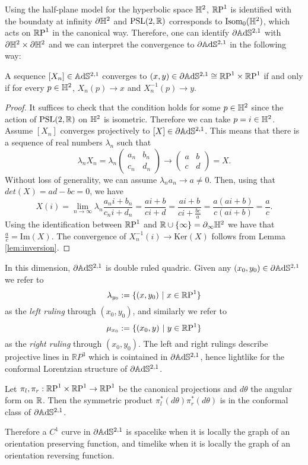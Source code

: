 Using the half-plane model for the hyperbolic space $\H^2$, $\S$ is identified with the boundaty at infinity $\partial \H^2$ and $\PSL$ corresponds to $\text{Isom}_0(\H^2)$, which acts on $\S$ in the canonical way.
Therefore, one can identify $\partial \A^{2,1}$ with $\partial \H^2 \times \partial \H^2$ and we can interpret the convergence to $\partial \A^{2,1}$ in the following way:
\begin{lemma} \label{lem:convergence}
    A sequence $[X_n] \in \A^{2,1}$ converges to $(x,y) \in \partial \A^{2,1} \cong \T$ if and only if for every $p\in\H^2$, $X_n(p) \to x$ and $X_n^{-1}(p) \to y$.
\end{lemma}

\begin{proof}
    It suffices to check that the condition holds for some $p\in\H^2$ since the action of $\PSL$ on $\H^2$ is isometric. Therefore we can take $p=i\in\H^2$. Assume $\left[ X_n \right]$ converges projectively to $\left[ X \right] \in \partial\A^{2,1}$. This means that there is a sequence of real numbers $\lambda_n$ such that
    \[
       \lambda_n X_n = \lambda_n
       \begin{pmatrix}
            a_n & b_n \\ c_n & d_n
        \end{pmatrix} \to
        \begin{pmatrix}
            a & b \\ c & d
        \end{pmatrix} =X.
    \]
    Without loss of generality, we can assume $\lambda_n a_n \to a \neq 0$. Then, using that $det(X)=ad-bc=0$, we have
    \[
        X(i) = \lim_{n\to \infty} \lambda_n \frac{a_n i + b_n}{c_n i + d_n} = \frac{ai +b}{ci+d} = \frac{ai + b}{ ci + \frac{bc}{a}} = \frac{a(ai+b)}{c(ai+b)} = \frac{a}{c}.
    \]
    Using the identification between $\S$ and $\R \cup \{ \infty \} = \partial_\infty \H^2$ we have that $\frac{a}{c} = \text{Im}(X)$. The convergence of $X_n^{-1}(i) \to \text{Ker}(X)$ follows from Lemma \ref{lem:inversion}.
\end{proof}

In this dimension, $\partial\A^{2,1}$ is double ruled quadric. Given any $(x_0,y_0) \in \partial\A^{2,1}$ we refer to
\[
    \lambda_{y_0} := \{ (x,y_0) \ | \ x \in\S \}
\]
as the \textit{left ruling} through $(x_0,y_0)$, and similarly we refer to
\[
    \mu_{x_0} := \{ (x_0,y) \ | \ y \in\S \}
\]
as the \textit{right ruling} through $(x_0,y_0)$. The left and right rulings describe projective lines in $\mathbb{R}P^3$ which is cointained in $\partial\A^{2,1}$, hence lightlike for the conformal Lorentzian structure of $\partial\A^{2,1}$.
\begin{proposition} \label{prop:angular}
    Let $\pi_l, \pi_r : \T \to\S$ be the canonical projections and $d\theta$ the angular form on $\R$. Then the symmetric product $\pi_l^*(d\theta)\pi_r^*(d\theta)$ is in the conformal class of $\partial\A^{2,1}$.
\end{proposition}
Therefore a $C^1$ curve in $\partial\A^{2,1}$ is spacelike when it is locally the graph of an orientation preserving function, and timelike when it is locally the graph of an orientation reversing function.


